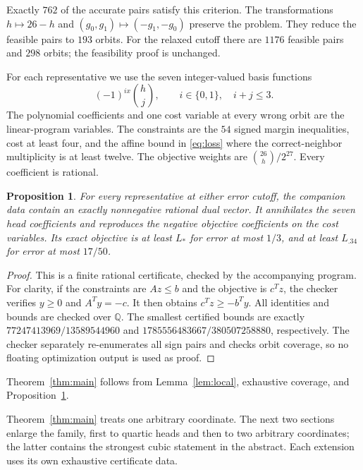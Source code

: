 \documentclass[11pt]{article}
\newtheorem{proposition}{Proposition}
\begin{document}
Exactly $762$ of the accurate pairs satisfy this criterion. The transformations $h\mapsto26-h$ and $(g_0,g_1)\mapsto(-g_1,-g_0)$ preserve the problem. They reduce the feasible pairs to $193$ orbits. For the relaxed cutoff there are $1176$ feasible pairs and $298$ orbits; the feasibility proof is unchanged.

For each representative we use the seven integer-valued basis functions
\[
 (-1)^{ix}\binom hj,\qquad i\in\{0,1\},\quad i+j\le3.
\]
The polynomial coefficients and one cost variable at every wrong orbit are the linear-program variables. The constraints are the $54$ signed margin inequalities, cost at least four, and the affine bound in \eqref{eq:loss} where the correct-neighbor multiplicity is at least twelve. The objective weights are $\binom{26}{h}/2^{27}$. Every coefficient is rational.

\begin{proposition}\label{prop:certificate}
For every representative at either error cutoff, the companion data contain an exactly nonnegative rational dual vector. It annihilates the seven head coefficients and reproduces the negative objective coefficients on the cost variables. Its exact objective is at least $L_*$ for error at most $1/3$, and at least $L_{.34}$ for error at most $17/50$.
\end{proposition}
\begin{proof}
This is a finite rational certificate, checked by the accompanying program. For clarity, if the constraints are $Az\le b$ and the objective is $c^Tz$, the checker verifies $y\ge0$ and $A^Ty=-c$. It then obtains $c^Tz\ge-b^Ty$. All identities and bounds are checked over $\mathbb Q$. The smallest certified bounds are exactly $77247413969/13589544960$ and $1785556483667/380507258880$, respectively. The checker separately re-enumerates all sign pairs and checks orbit coverage, so no floating optimization output is used as proof.
\end{proof}
Theorem~\ref{thm:main} follows from Lemma~\ref{lem:local}, exhaustive coverage, and Proposition~\ref{prop:certificate}.

Theorem~\ref{thm:main} treats one arbitrary coordinate. The next two
sections enlarge the family, first to quartic heads and then to two
arbitrary coordinates; the latter contains the strongest cubic statement
in the abstract. Each extension uses its own exhaustive certificate data.
\end{document}

